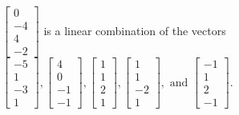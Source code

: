 \begin{exercise}
\begin{exerciseStatement}
  \end{exerciseStatement}
  \begin{exerciseAnswer}
   \(\left[\begin{array}{c}
0 \\
-4 \\
4 \\
-2
\end{array}\right]\) 
  	 is  
	a linear combination of the vectors \(\left[\begin{array}{c}
-5 \\
1 \\
-3 \\
1
\end{array}\right] , \left[\begin{array}{c}
4 \\
0 \\
-1 \\
-1
\end{array}\right] , \left[\begin{array}{c}
1 \\
1 \\
2 \\
1
\end{array}\right] , \left[\begin{array}{c}
1 \\
1 \\
-2 \\
1
\end{array}\right] , \text{ and } \left[\begin{array}{c}
-1 \\
1 \\
2 \\
-1
\end{array}\right]\).

	
  


  \end{exerciseAnswer}
\end{exercise}
